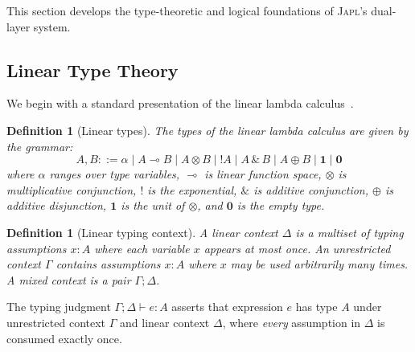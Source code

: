 \documentclass[11pt]{article}
\newtheorem{definition}[theorem]{Definition}
\newcommand{\JAPL}{\textsc{Japl}}
\newcommand{\lolli}{\multimap}
\newcommand{\tensor}{\otimes}
\newcommand{\bang}{{\mathop{!}}}
\begin{document}
This section develops the type-theoretic and logical foundations of
\JAPL{}'s dual-layer system.

\subsection{Linear Type Theory}\label{sec:linear-type-theory}

We begin with a standard presentation of the linear lambda
calculus~\cite{wadler1990linear,wadler1993taste}.

\begin{definition}[Linear types]\label{def:linear-types}
The types of the linear lambda calculus are given by the grammar:
\[
  A, B ::= \alpha \mid A \lolli B \mid A \tensor B \mid \bang A
           \mid A \,\&\, B \mid A \oplus B \mid \mathbf{1} \mid \mathbf{0}
\]
where $\alpha$ ranges over type variables, $\lolli$ is linear
function space, $\tensor$ is multiplicative conjunction, $\bang$ is
the exponential, $\&$ is additive conjunction, $\oplus$ is additive
disjunction, $\mathbf{1}$ is the unit of $\tensor$, and $\mathbf{0}$
is the empty type.
\end{definition}

\begin{definition}[Linear typing context]\label{def:linear-context}
A \emph{linear context} $\Delta$ is a multiset of typing assumptions
$x : A$ where each variable $x$ appears at most once.  An
\emph{unrestricted context} $\Gamma$ contains assumptions $x : A$
where $x$ may be used arbitrarily many times.  A \emph{mixed context}
is a pair $\Gamma; \Delta$.
\end{definition}

The typing judgment $\Gamma; \Delta \vdash e : A$ asserts that
expression $e$ has type $A$ under unrestricted context $\Gamma$ and
linear context $\Delta$, where \emph{every} assumption in $\Delta$ is
consumed exactly once.
\end{document}
